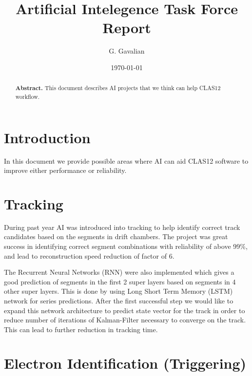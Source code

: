 \documentclass[11pt]{revtex4}
\begin{document}
\title{ Artificial Intelegence Task Force Report}


\author{G. Gavalian}
%

\date{\today}

\begin{abstract}
{{\bf Abstract.}
This document describes AI projects that we think can help CLAS12 workflow.
}
\end{abstract}
\maketitle

\vspace{1in}

\section{Introduction}

In this document we provide possible areas where AI can aid CLAS12 software
to improve either performance or reliability.

\section{Tracking}

During past year AI was introduced into tracking to help identify correct
track candidates based on the segments in drift chambers. The project was
great success in identifying correct segment combinations with reliability
of above 99\%, and lead to reconstruction speed reduction of factor of 6.

The Recurrent Neural Networks (RNN) were also implemented which gives a good prediction
of segments in the first 2 super layers based on segments in 4 other super layers.
This is done by using Long Short Term Memory (LSTM) network for series predictions.
After the first successful step we would like to expand this network architecture
to predict state vector for the track in order to reduce number of iterations
of Kalman-Filter necessary to converge on the track. This can lead to further
reduction in tracking time.

\section{Electron Identification (Triggering)}
\end{document}
